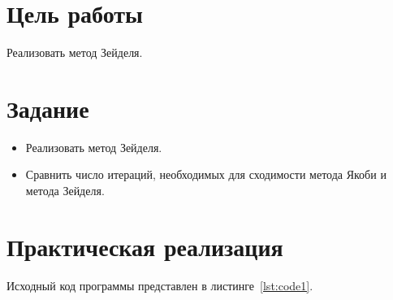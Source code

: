 \documentclass[a4paper, 14pt]{extarticle}
\begin{document}
\renewcommand{\ttdefault}{pcr}

\setlength{\tabcolsep}{3pt}
\newpage
\setcounter{page}{2}

\section{Цель работы}\label{Sect::goal}

Реализовать метод Зейделя.

\section{Задание}\label{Sect::task}

\begin{itemize}
    \item Реализовать метод Зейделя.
    \item Сравнить число итераций, необходимых для сходимости метода Якоби и метода Зейделя.
\end{itemize}

\section{Практическая реализация}\label{Sect::code}

Исходный код программы представлен в листинге~\ref{lst:code1}.
\end{document}
